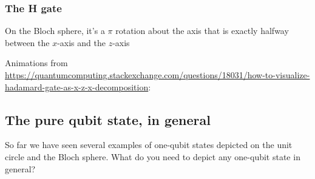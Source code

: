 \documentclass{article}
\theoremstyle{definition}
\begin{document}
\newpage
\subsubsection{The H gate}
\begin{figure}[H]
	\label{fig:Hgate}
\end{figure}
On the Bloch sphere, it's a $\pi$ rotation about the axis that is exactly halfway between the $x$-axis and the $z$-axis

Animations from \url{https://quantumcomputing.stackexchange.com/questions/18031/how-to-visualize-hadamard-gate-as-x-z-x-decomposition}:

\noindent%
\begin{minipage}[t]{0.45\linewidth}
	\begin{frame}{}
	\end{frame}\end{minipage}%
\hfill%
\begin{minipage}[t]{0.45\linewidth}
	\begin{frame}{}
	\end{frame}
\end{minipage}

\newpage
\subsection{The pure qubit state, in general}
So far we have seen several examples of one-qubit states depicted on the unit circle and the Bloch sphere.  What do you need to depict any one-qubit state in general?
\end{document}
